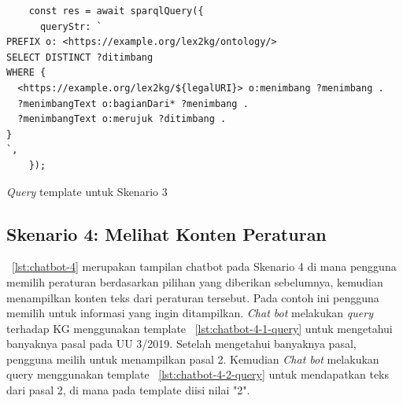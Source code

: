 \begin{listing}[H]
  \begin{verbatim}
    const res = await sparqlQuery({
      queryStr: `
PREFIX o: <https://example.org/lex2kg/ontology/>
SELECT DISTINCT ?ditimbang
WHERE {
  <https://example.org/lex2kg/${legalURI}> o:menimbang ?menimbang .
  ?menimbangText o:bagianDari* ?menimbang .
  ?menimbangText o:merujuk ?ditimbang .
}
`,
    });
  \end{verbatim}
  \caption{\textit{Query} template untuk Skenario 3}
  \label{lst:chatbot-3-query}
\end{listing}

\subsection{Skenario 4: Melihat Konten Peraturan}
\label{subsec:skenario-4}

\lst~\ref{lst:chatbot-4} merupakan tampilan chatbot pada Skenario 4 di mana pengguna memilih
peraturan berdasarkan pilihan yang diberikan sebelumnya, kemudian menampilkan konten teks dari
peraturan tersebut. Pada contoh ini pengguna memilih  untuk informasi yang ingin
ditampilkan. \textit{Chat bot} melakukan \textit{query} terhadap KG menggunakan template
\lst~\ref{lst:chatbot-4-1-query} untuk mengetahui banyaknya pasal pada UU 3/2019. Setelah mengetahui
banyaknya pasal, pengguna meilih untuk menampilkan pasal 2. Kemudian \textit{Chat bot} melakukan query
menggunakan template \lst~\ref{lst:chatbot-4-2-query} untuk mendapatkan teks dari pasal 2, di mana
 pada template diisi nilai "2".

